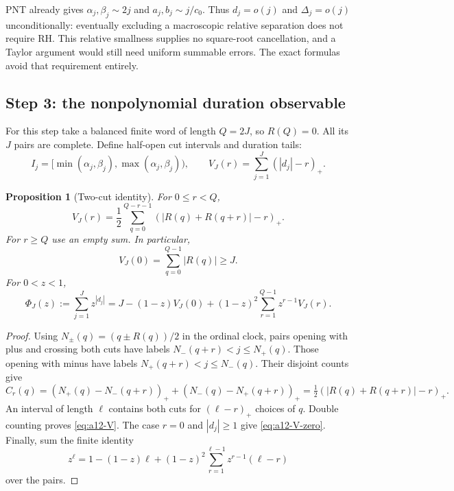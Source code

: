 \documentclass[11pt]{amsart}
\numberwithin{equation}{section}
\theoremstyle{plain}
\newtheorem{proposition}[theorem]{Proposition}
\theoremstyle{definition}
\theoremstyle{remark}
\begin{document}
PNT already gives $\alpha_j,\beta_j\sim2j$ and $a_j,b_j\sim j/c_0$.
Thus $d_j=o(j)$ and $\Delta_j=o(j)$ unconditionally: eventually excluding
a macroscopic relative separation does not require RH. This relative
smallness supplies no square-root cancellation, and a Taylor argument
would still need uniform summable errors. The exact formulas avoid that
requirement entirely.

\subsection{Step 3: the nonpolynomial duration observable}
\label{subsec:a12-duration}
For this step take a balanced finite word of length $Q=2J$, so $R(Q)=0$.
All its $J$ pairs are complete. Define half-open cut intervals and duration tails:
\begin{equation}
\label{eq:a12-halfopen}
I_j=[\min(\alpha_j,\beta_j),\max(\alpha_j,\beta_j)),\qquad
V_J(r)=\sum_{j=1}^J(|d_j|-r)_+.
\end{equation}
\begin{proposition}[Two-cut identity]
\label{prop:a12-two-cut}
For $0\le r<Q$,
\begin{equation}
\label{eq:a12-V}
\boxed{V_J(r)=\frac12\sum_{q=0}^{Q-r-1}
(|R(q)+R(q+r)|-r)_+.}
\end{equation}
For $r\ge Q$ use an empty sum. In particular,
\begin{equation}
\label{eq:a12-V-zero}
V_J(0)=\sum_{q=0}^{Q-1}|R(q)|\ge J.
\end{equation}
For $0<z<1$,
\begin{equation}
\label{eq:a12-Phi}
\Phi_J(z):=\sum_{j=1}^Jz^{|d_j|}
=J-(1-z)V_J(0)+(1-z)^2\sum_{r=1}^{Q-1}z^{r-1}V_J(r).
\end{equation}
\end{proposition}
\begin{proof}
Using $N_\pm(q)=(q\pm R(q))/2$ in the ordinal clock, pairs opening with
plus and crossing both cuts have labels $N_-(q+r)<j\le N_+(q)$.
Those opening with minus have labels $N_+(q+r)<j\le N_-(q)$.
Their disjoint counts give
\begin{equation}
\label{eq:a12-Cr}
C_r(q)=
(N_+(q)-N_-(q+r))_++(N_-(q)-N_+(q+r))_+
=\tfrac12(|R(q)+R(q+r)|-r)_+.
\end{equation}
An interval of length $\ell$ contains both cuts for $(\ell-r)_+$ choices
of $q$. Double counting proves \eqref{eq:a12-V}. The case $r=0$ and
$|d_j|\ge1$ give \eqref{eq:a12-V-zero}.
Finally, sum the finite identity
\begin{equation}
\label{eq:a12-single-duration}
z^\ell=1-(1-z)\ell+
(1-z)^2\sum_{r=1}^{\ell-1}z^{r-1}(\ell-r)
\end{equation}
over the pairs.
\end{proof}
\end{document}
